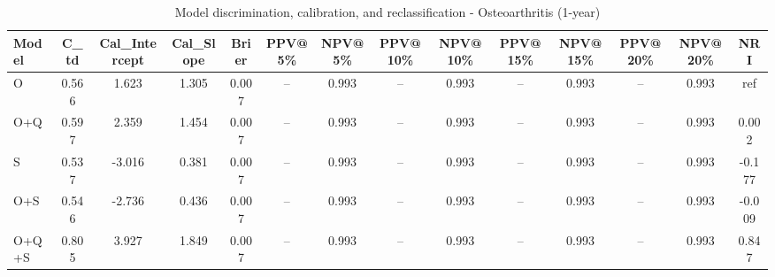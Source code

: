 \begin{table}[htbp]
\centering
\small
\caption{Model discrimination, calibration, and reclassification - Osteoarthritis (1-year)}
\label{tab:perf_osteoarthritis_1y}
\begin{tabular}{lccccccccccccc}
\toprule
Model & C\_td & Cal\_Intercept & Cal\_Slope & Brier & PPV@5\% & NPV@5\% & PPV@10\% & NPV@10\% & PPV@15\% & NPV@15\% & PPV@20\% & NPV@20\% & NRI \\
\midrule
O & 0.566 & 1.623 & 1.305 & 0.007 & -- & 0.993 & -- & 0.993 & -- & 0.993 & -- & 0.993 & ref \\
O+Q & 0.597 & 2.359 & 1.454 & 0.007 & -- & 0.993 & -- & 0.993 & -- & 0.993 & -- & 0.993 & 0.002 \\
S & 0.537 & -3.016 & 0.381 & 0.007 & -- & 0.993 & -- & 0.993 & -- & 0.993 & -- & 0.993 & -0.177 \\
O+S & 0.546 & -2.736 & 0.436 & 0.007 & -- & 0.993 & -- & 0.993 & -- & 0.993 & -- & 0.993 & -0.009 \\
O+Q+S & 0.805 & 3.927 & 1.849 & 0.007 & -- & 0.993 & -- & 0.993 & -- & 0.993 & -- & 0.993 & 0.847 \\
\bottomrule
\end{tabular}
\end{table}